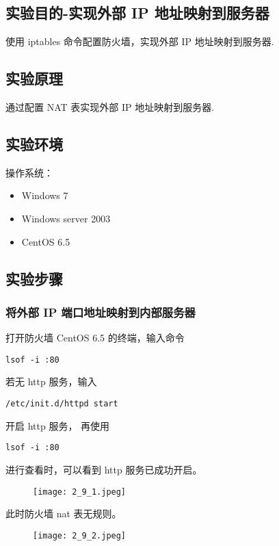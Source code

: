 \subsection{实验目的-实现外部 IP 地址映射到服务器}
使用 iptables 命令配置防火墙，实现外部 IP 地址映射到服务器.
%
\subsection{实验原理}
通过配置 NAT 表实现外部 IP 地址映射到服务器.
%
\subsection{实验环境}
操作系统：
\begin{itemize}
  \item Windows 7
  \item Windows server 2003
  \item CentOS 6.5
\end{itemize}
%
\subsection{实验步骤}
\subsubsection{将外部 IP 端口地址映射到内部服务器}
打开防火墙 CentOS 6.5 的终端，输入命令
\begin{verbatim}
lsof -i :80
\end{verbatim}
若无 http 服务，输入
\begin{verbatim}
/etc/init.d/httpd start
\end{verbatim}
开启 http 服务，
再使用
\begin{verbatim}
lsof -i :80
\end{verbatim}
进行查看时，可以看到 http 服务已成功开启。
\begin{figure}[H]
  \begin{center}
    \texttt{[image: 2\_9\_1.jpeg]}
  \end{center}
\end{figure}

此时防火墙 nat 表无规则。
\begin{figure}[H]
  \begin{center}
    \texttt{[image: 2\_9\_2.jpeg]}
  \end{center}
\end{figure}

